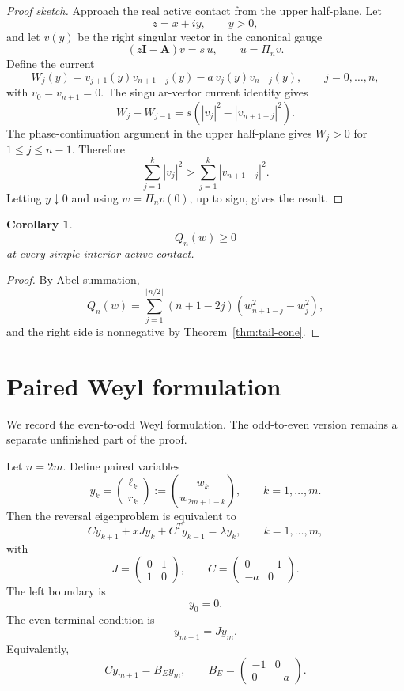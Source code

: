 \documentclass[11pt]{article}
\numberwithin{equation}{section}
\newtheorem{corollary}[theorem]{Corollary}
\begin{document}
\begin{proof}[Proof sketch]
Approach the real active contact from the upper half-plane. Let
\[
z=x+iy,\qquad y>0,
\]
and let \(v(y)\) be the right singular vector in the canonical gauge
\[
(z\mathbf I-\mathbf A)v=s\,u,\qquad u=\Pi_n\overline v.
\]
Define the current
\[
W_j(y)
=
v_{j+1}(y)v_{n+1-j}(y)-a\,v_j(y)v_{n-j}(y),
\qquad j=0,\dots,n,
\]
with \(v_0=v_{n+1}=0\). The singular-vector current identity gives
\[
W_j-W_{j-1}
=
s\left(|v_j|^2-|v_{n+1-j}|^2\right).
\]
The phase-continuation argument in the upper half-plane gives \(W_j>0\) for
\(1\le j\le n-1\). Therefore
\[
\sum_{j=1}^{k}|v_j|^2
>
\sum_{j=1}^{k}|v_{n+1-j}|^2.
\]
Letting \(y\downarrow0\) and using \(w=\Pi_nv(0)\), up to sign, gives the result.
\end{proof}

\begin{corollary}
\[
Q_n(w)\ge0
\]
at every simple interior active contact.
\end{corollary}

\begin{proof}
By Abel summation,
\[
Q_n(w)
=
\sum_{j=1}^{\lfloor n/2\rfloor}(n+1-2j)
\left(w_{n+1-j}^2-w_j^2\right),
\]
and the right side is nonnegative by Theorem~\ref{thm:tail-cone}.
\end{proof}

\section{Paired Weyl formulation}

We record the even-to-odd Weyl formulation. The odd-to-even version remains a
separate unfinished part of the proof.

Let \(n=2m\). Define paired variables
\[
y_k=
\binom{\ell_k}{r_k}
:=
\binom{w_k}{w_{2m+1-k}},
\qquad k=1,\dots,m.
\]
Then the reversal eigenproblem is equivalent to
\[
C y_{k+1}+xJ y_k+C^T y_{k-1}=\lambda y_k,
\qquad k=1,\dots,m,
\]
with
\[
J=
\begin{pmatrix}0&1\\1&0\end{pmatrix},
\qquad
C=
\begin{pmatrix}0&-1\\-a&0\end{pmatrix}.
\]
The left boundary is
\[
y_0=0.
\]
The even terminal condition is
\[
y_{m+1}=Jy_m.
\]
Equivalently,
\[
C y_{m+1}=B_Ey_m,
\qquad
B_E=
\begin{pmatrix}-1&0\\0&-a\end{pmatrix}.
\]
\end{document}
